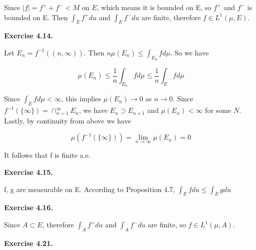 \documentclass[12pt]{article}
\newcommand{\abs}[1]{\left| #1 \right|}
\begin{document}
Since $\abs{f} = f^{+} + f^{-} < M$ on $E$, which means it is bounded on E, so $f^{+}$ and $f^{-}$ is bounded on E. Then $\int_{E}f^{+}du$ and $\int_{E}f^{-}du$ are finite, therefore $f \in L^{1}(\mu, E)$.

\textbf{Exercise 4.14.}

Let $E_n = f^{-1}((n,\infty))$. Then $n\mu(E_n) \leq \int_{E_n} fd\mu$. So we have

$$ \mu(E_n) \leq \frac{1}{n} \int_{E_n}  fd\mu \leq  \frac{1}{n} \int_{E}  fd\mu  $$

Since  $\int_{E}  fd\mu < \infty$, this implies $\mu(E_n) \rightarrow 0$ as $n \rightarrow 0$. Since $f^{-1}(\{\infty\}) = \cap_{n=1}^{\infty}E_{n}$, we have $E_{n} \supset E_{n+1}$ and $\mu(E_n) < \infty$ for some $N$. Lastly, by continuity from above we have

$$\mu(f^{-1}(\{\infty\})) = \lim_{n \rightarrow \infty} \mu(E_n) = 0$$

It follows that f is finite a.e.

\textbf{Exercise 4.15.}

f, g are measurable on E. According to Proposition 4.7, $\int_{E}f du \leq \int_{E}g du$

\textbf{Exercise 4.16.}

Since $A \subset E$, therefore $\int_{A}f^{+} du$ and $\int_{A}f^{-} du$ are finite, so $f \in L^{1}(\mu, A)$.

\textbf{Exercise 4.21.}
 
\end{document}
